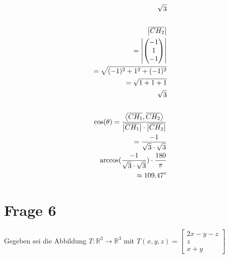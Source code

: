 \begin{align*}
    \sqrt{3}                                                                                                                                           \\\\ \pagebreak[2]
    \left|\overline{CH_2}\right|                                                                                                                       \\
    = \left|\begin{pmatrix}
                -1 \\ 1 \\ -1
            \end{pmatrix}\right|                                                                                                                       \\
    = \sqrt{(-1)^2 + 1^2 + (-1)^2}                                                                                                                     \\
    = \sqrt{1 + 1 + 1}                                                                                                                                 \\
    \sqrt{3}                                                                                                                                           \\\\ \pagebreak[2]
    \cos(\theta) = \frac{\left\langle \overline{CH_1}, \overline{CH_2} \right\rangle}{\left|\overline{CH_1}\right| \cdot \left|\overline{CH_2}\right|} \\
    = \frac{-1}{\sqrt{3} \cdot \sqrt{3}}                                                                                                               \\
    \arccos(\frac{-1}{\sqrt{3} \cdot \sqrt{3}}) \cdot \frac{180}{\pi}                                                                                  \\
    \approx 109.47^\circ
\end{align*}

\section{Frage 6}

Gegeben sei die Abbildung $T : \mathbb{R}^3 \rightarrow \mathbb{R}^3$ mit
$T(x,y,z) = \begin{bmatrix}
        2x - y - z \\
        z          \\
        x + y
    \end{bmatrix}$

